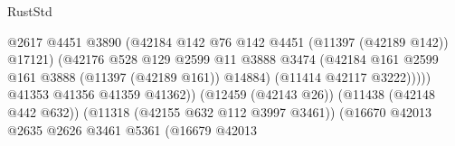 \begin{lexlean}{RustStd}
\begin{coremodule}
                                                          @2617
                                                          @4451
                                                          @3890
                                                          (@42184
                                                            @142
                                                            @76
                                                            @142
                                                            @4451
                                                            (@11397 (@42189 @142))
                                                            @17121)
                                                          (@42176
                                                            @528
                                                            @129
                                                            @2599
                                                            @11
                                                            @3888
                                                            @3474
                                                            (@42184
                                                              @161
                                                              @2599
                                                              @161
                                                              @3888
                                                              (@11397 (@42189 @161))
                                                              @14884)
                                                            (@11414 @42117 @3222)))))
                                                    @41353
                                                    @41356
                                                    @41359
                                                    @41362))
                                                (@12459 (@42143 @26))
                                                (@11438 (@42148 @442 @632))
                                                (@11318 (@42155 @632 @112 @3997 @3461))
                                                (@16670
                                                  @42013
                                                  @2635
                                                  @2626
                                                  @3461
                                                  @5361
                                                  (@16679
                                                    @42013

\end{coremodule}
\end{lexlean}
